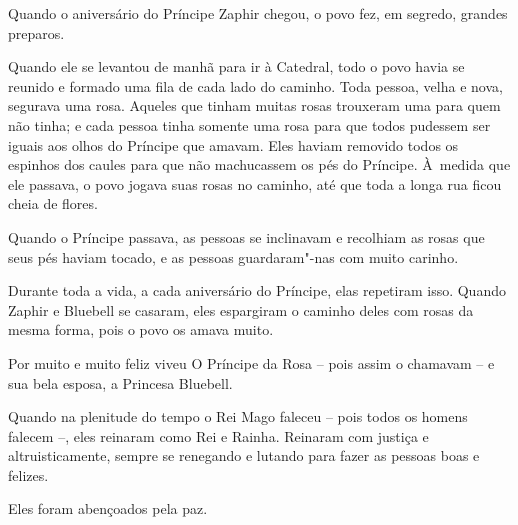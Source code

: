 Quando o aniversário do Príncipe Zaphir chegou, o povo fez, em segredo,
grandes preparos.

Quando ele se levantou de manhã para ir à Catedral, todo o povo havia se
reunido e formado uma fila de cada lado do caminho. Toda pessoa, velha e
nova, segurava uma rosa. Aqueles que tinham muitas rosas trouxeram uma
para quem não tinha; e cada pessoa tinha somente uma rosa para que todos
pudessem ser iguais aos olhos do Príncipe que amavam. Eles haviam
removido todos os espinhos dos caules para que não machucassem os pés do
Príncipe. À~medida que ele passava, o povo jogava suas rosas no caminho,
até que toda a longa rua ficou cheia de flores.

Quando o Príncipe passava, as pessoas se inclinavam e recolhiam as rosas
que seus pés haviam tocado, e as pessoas guardaram"-nas com muito
carinho.

Durante toda a vida, a cada aniversário do Príncipe, elas repetiram isso.
Quando Zaphir e Bluebell se casaram, eles espargiram o caminho deles com
rosas da mesma forma, pois o povo os amava muito.

Por muito e muito feliz viveu O Príncipe da Rosa -- pois assim o
chamavam -- e sua bela esposa, a Princesa Bluebell.

Quando na plenitude do tempo o Rei Mago faleceu -- pois todos os homens
falecem --, eles reinaram como Rei e Rainha. Reinaram com justiça e
altruisticamente, sempre se renegando e lutando para fazer as pessoas
boas e felizes.

Eles foram abençoados pela paz.
